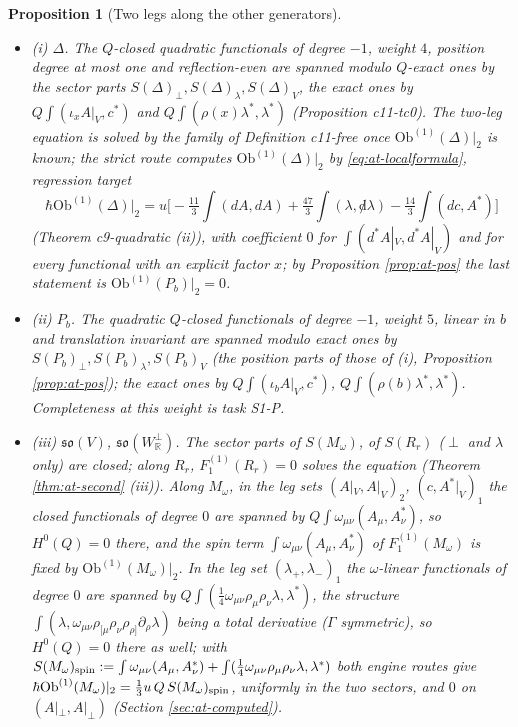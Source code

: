 \documentclass[11pt]{article}
\numberwithin{equation}{section}
\theoremstyle{plain}
\newtheorem{proposition}[theorem]{Proposition}
\theoremstyle{definition}
\newcommand{\Ap}{A|_{\perp}}
\newcommand{\AV}{A|_V}
\newcommand{\Ob}{\mathrm{Ob}}
\newcommand{\dslash}{{\not d}}
\begin{document}
\begin{proposition}[Two legs along the other generators]
\label{prop:at-two}
\leavevmode
\begin{itemize}
\item (i) $\Delta$. The $Q$-closed quadratic functionals of degree $-1$, weight $4$, position degree at most one and reflection-even are spanned modulo $Q$-exact ones by the sector parts $S(\Delta)_\perp,S(\Delta)_\lambda,S(\Delta)_V$, the exact ones by $Q\int(\iota_x\AV,c^*)$ and $Q\int(\rho(x)\lambda^*,\lambda^*)$ (Proposition c11-tc0). The two-leg equation is solved by the family of Definition c11-free once $\Ob^{(1)}(\Delta)|_2$ is known; the strict route computes $\Ob^{(1)}(\Delta)|_2$ by \eqref{eq:at-localformula}, regression target
\begin{equation}
\hbar\Ob^{(1)}(\Delta)\big|_2=u\Big[-\tfrac{11}3\int(dA,dA)+\tfrac{47}3\int(\lambda,\dslash\lambda)-\tfrac{14}3\int(dc,A^*)\Big]
\label{eq:at-reg2}
\end{equation}
(Theorem c9-quadratic (ii)), with coefficient $0$ for $\int(d^*\AV,d^*\AV)$ and for every functional with an explicit factor $x$; by Proposition \ref{prop:at-pos} the last statement is $\Ob^{(1)}(P_b)|_2=0$.
\item (ii) $P_b$. The quadratic $Q$-closed functionals of degree $-1$, weight $5$, linear in $b$ and translation invariant are spanned modulo exact ones by $S(P_b)_\perp,S(P_b)_\lambda,S(P_b)_V$ (the position parts of those of (i), Proposition \ref{prop:at-pos}); the exact ones by $Q\int(\iota_b\AV,c^*)$, $Q\int(\rho(b)\lambda^*,\lambda^*)$. Completeness at this weight is task S1-P.
\item (iii) $\mathfrak{so}(V)$, $\mathfrak{so}(W^\perp_{\mathbb R})$. The sector parts of $S(M_\omega)$, of $S(R_r)$ ($\perp$ and $\lambda$ only) are closed; along $R_r$, $F_1^{(1)}(R_r)=0$ solves the equation (Theorem \ref{thm:at-second} (iii)). Along $M_\omega$, in the leg sets $(\AV,\AV)_2$, $(c,A^*|_V)_1$ the closed functionals of degree $0$ are spanned by $Q\int\omega_{\mu\nu}(A_\mu,A^*_\nu)$, so $H^0(Q)=0$ there, and the spin term $\int\omega_{\mu\nu}(A_\mu,A^*_\nu)$ of $F_1^{(1)}(M_\omega)$ is fixed by $\Ob^{(1)}(M_\omega)|_2$. In the leg set $(\lambda_+,\lambda_-)_1$ the $\omega$-linear functionals of degree $0$ are spanned by $Q\int(\tfrac14\omega_{\mu\nu}\rho_\mu\rho_\nu\lambda,\lambda^*)$, the structure $\int(\lambda,\omega_{\mu\nu}\rho_{[\mu}\rho_\nu\rho_{\rho]}\partial_\rho\lambda)$ being a total derivative ($\Gamma$ symmetric), so $H^0(Q)=0$ there as well; with $S(M_\omega)_{\rm spin}:=\int\omega_{\mu\nu}(A_\mu,A^*_\nu)+\int(\tfrac14\omega_{\mu\nu}\rho_\mu\rho_\nu\lambda,\lambda^*)$ both engine routes give $\hbar\Ob^{(1)}(M_\omega)|_2=\tfrac13u\,Q\,S(M_\omega)_{\rm spin}$, uniformly in the two sectors, and $0$ on $(\Ap,\Ap)$ (Section \ref{sec:at-computed}).

\end{itemize}
\end{proposition}
\end{document}
